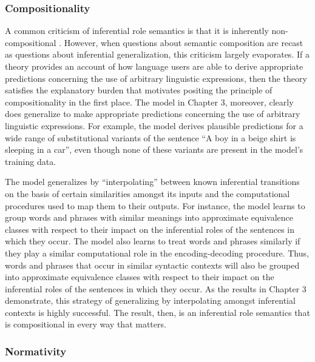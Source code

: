 \subsubsection{Compositionality}

A common criticism of inferential role semantics is that it is inherently non-compositional \citep{FodorLepore:1991}. However, when questions about semantic composition are recast as questions about inferential generalization, this criticism largely evaporates. If a theory provides an account of how language users are able to derive appropriate predictions concerning the use of arbitrary linguistic expressions, then the theory satisfies the explanatory burden that motivates positing the principle of compositionality in the first place. The model in Chapter 3, moreover, clearly does generalize to make appropriate predictions concerning the use of arbitrary linguistic expressions. For example, the model derives plausible predictions for a wide range of substitutional variants of the sentence ``A boy in a beige shirt is sleeping in a car'', even though none of these variants are present in the model's training data. 

The model generalizes by ``interpolating'' between known inferential transitions on the basis of certain similarities amongst its inputs and the computational procedures used to map them to their outputs. For instance, the model learns to group words and phrases with similar meanings into approximate equivalence classes with respect to their impact on the inferential roles of the sentences in which they occur. The model also learns to treat words and phrases similarly if they play a similar computational role in the encoding-decoding procedure. Thus, words and phrases that occur in similar syntactic contexts will also be grouped into approximate equivalence classes with respect to their impact on the inferential roles of the sentences in which they occur. As the results in Chapter 3 demonstrate, this strategy of generalizing by interpolating amongst inferential contexts is highly successful. The result, then, is an inferential role semantics that is compositional in every way that matters. 

\subsubsection{Normativity}

